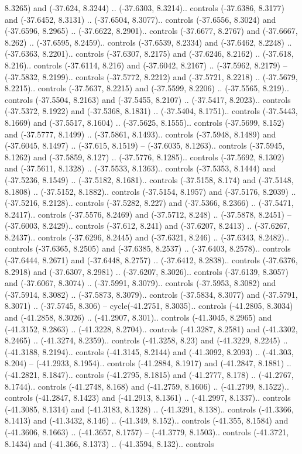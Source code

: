 \begin{scope}[shift={(2.5552, 9.9912)}]
\begin{scope}[shift={(48.1654, -14.8546)}]
8.3265) and (-37.624, 8.3244) .. (-37.6303, 8.3214).. controls (-37.6386, 8.3177) and (-37.6452, 8.3131) .. (-37.6504, 8.3077).. controls (-37.6556, 8.3024) and (-37.6596, 8.2965) .. (-37.6622, 8.2901).. controls (-37.6677, 8.2767) and (-37.6667, 8.262) .. (-37.6595, 8.2459).. controls (-37.6539, 8.2334) and (-37.6462, 8.2248) .. (-37.6363, 8.2201).. controls (-37.6307, 8.2175) and (-37.6246, 8.2162) .. (-37.618, 8.216).. controls (-37.6114, 8.216) and (-37.6042, 8.2167) .. (-37.5962, 8.2179) -- (-37.5832, 8.2199).. controls (-37.5772, 8.2212) and (-37.5721, 8.2218) .. (-37.5679, 8.2215).. controls (-37.5637, 8.2215) and (-37.5599, 8.2206) .. (-37.5565, 8.219).. controls (-37.5504, 8.2163) and (-37.5455, 8.2107) .. (-37.5417, 8.2023).. controls (-37.5372, 8.1922) and (-37.5368, 8.1831) .. (-37.5404, 8.1751).. controls (-37.5443, 8.1669) and (-37.5517, 8.1604) .. (-37.5625, 8.1555).. controls (-37.5699, 8.152) and (-37.5777, 8.1499) .. (-37.5861, 8.1493).. controls (-37.5948, 8.1489) and (-37.6045, 8.1497) .. (-37.615, 8.1519) -- (-37.6035, 8.1263).. controls (-37.5945, 8.1262) and (-37.5859, 8.127) .. (-37.5776, 8.1285).. controls (-37.5692, 8.1302) and (-37.5611, 8.1328) .. (-37.5533, 8.1363).. controls (-37.5353, 8.1444) and (-37.5236, 8.1549) .. (-37.5182, 8.1681).. controls (-37.5158, 8.174) and (-37.5148, 8.1808) .. (-37.5152, 8.1882).. controls (-37.5154, 8.1957) and (-37.5176, 8.2039) .. (-37.5216, 8.2128).. controls (-37.5282, 8.227) and (-37.5366, 8.2366) .. (-37.5471, 8.2417).. controls (-37.5576, 8.2469) and (-37.5712, 8.248) .. (-37.5878, 8.2451) -- (-37.6003, 8.2429).. controls (-37.612, 8.241) and (-37.6207, 8.2413) .. (-37.6267, 8.2437).. controls (-37.6296, 8.2445) and (-37.6321, 8.246) .. (-37.6343, 8.2482).. controls (-37.6365, 8.2505) and (-37.6385, 8.2537) .. (-37.6403, 8.2578).. controls (-37.6444, 8.2671) and (-37.6448, 8.2757) .. (-37.6412, 8.2838).. controls (-37.6376, 8.2918) and (-37.6307, 8.2981) .. (-37.6207, 8.3026).. controls (-37.6139, 8.3057) and (-37.6067, 8.3074) .. (-37.5991, 8.3079).. controls (-37.5953, 8.3082) and (-37.5914, 8.3082) .. (-37.5873, 8.3079).. controls (-37.5834, 8.3077) and (-37.5791, 8.3071) .. (-37.5745, 8.306) -- cycle(-41.2751, 8.3035).. controls (-41.2805, 8.3034) and (-41.2858, 8.3026) .. (-41.2907, 8.301).. controls (-41.3045, 8.2965) and (-41.3152, 8.2863) .. (-41.3228, 8.2704).. controls (-41.3287, 8.2581) and (-41.3302, 8.2465) .. (-41.3274, 8.2359).. controls (-41.3258, 8.23) and (-41.3229, 8.2245) .. (-41.3188, 8.2194).. controls (-41.3145, 8.2144) and (-41.3092, 8.2093) .. (-41.303, 8.204) -- (-41.2933, 8.1954).. controls (-41.2884, 8.1917) and (-41.2847, 8.1881) .. (-41.2821, 8.1847).. controls (-41.2795, 8.1815) and (-41.2777, 8.178) .. (-41.2767, 8.1744).. controls (-41.2748, 8.168) and (-41.2759, 8.1606) .. (-41.2799, 8.1522).. controls (-41.2847, 8.1423) and (-41.2913, 8.1361) .. (-41.2997, 8.1337).. controls (-41.3085, 8.1314) and (-41.3183, 8.1328) .. (-41.3291, 8.138).. controls (-41.3366, 8.1413) and (-41.3432, 8.146) .. (-41.349, 8.152).. controls (-41.355, 8.1584) and (-41.3606, 8.1663) .. (-41.3657, 8.1757) -- (-41.3779, 8.1503).. controls (-41.3721, 8.1434) and (-41.366, 8.1373) .. (-41.3594, 8.132).. controls 
\end{scope}
\end{scope}
